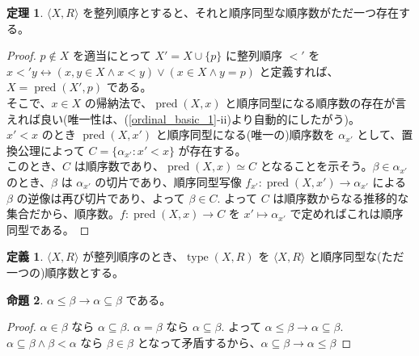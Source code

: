 \documentclass{jsarticle}
\theoremstyle{definition}
\newtheorem*{definition*}{定義}
\newtheorem{theorem}{定理}[section]
\newtheorem{proposition}[theorem]{命題}
\begin{document}
    \begin{theorem}
        $\langle X, R \rangle$ を整列順序とすると、それと順序同型な順序数がただ一つ存在する。
    \end{theorem}
    \begin{proof}
        $p \not\in X$ を適当にとって $X' = X \cup \{p\}$ に整列順序 $<'$ を\\
        $x <' y \leftrightarrow (x, y \in X \land x < y) \lor (x \in X \land y = p)$ と定義すれば、$X = \operatorname{pred}(X', p)$ である。\\
        そこで、$x \in X$ の帰納法で、$\operatorname{pred}(X, x)$ と順序同型になる順序数の存在が言えれば良い(唯一性は、(\ref{ordinal_basic_1}-ii)より自動的にしたがう)。\\
        $x' < x$ のとき $\operatorname{pred}(X, x')$ と順序同型になる(唯一の)順序数を $\alpha_{x'}$ として、置換公理によって $C = \{\alpha_{x'} : x' < x\}$ が存在する。\\
        このとき、$C$ は順序数であり、$\operatorname{pred}(X, x) \simeq C$ となることを示そう。$\beta \in \alpha_{x'}$ のとき、$\beta$ は $\alpha_{x'}$ の切片であり、順序同型写像 $f_{x'} : \operatorname{pred}(X, x') \rightarrow \alpha_{x'}$ による $\beta$ の逆像は再び切片であり、よって $\beta \in C.$ よって $C$ は順序数からなる推移的な集合だから、順序数。$f : \operatorname{pred}(X, x) \rightarrow C$ を $x' \mapsto \alpha_{x'}$ で定めればこれは順序同型である。
    \end{proof}
    \begin{definition*}
        $\langle X, R \rangle$ が整列順序のとき、$\operatorname{type}(X, R)$ を $\langle X, R \rangle$ と順序同型な(ただ一つの)順序数とする。
    \end{definition*}
    \vspace{1ex}
    
    \begin{proposition} \label{ordinal_basic_3} $\alpha \leq \beta \rightarrow \alpha \subseteq \beta$ である。
    \end{proposition}
    \begin{proof}
        $\alpha \in \beta$ なら $\alpha \subseteq \beta.$ $\alpha = \beta$ なら $\alpha \subseteq \beta.$ よって $\alpha \leq \beta \rightarrow \alpha \subseteq \beta.$ \\
        $\alpha \subseteq \beta \land \beta < \alpha$ なら $\beta \in \beta$ となって矛盾するから、$\alpha \subseteq \beta \rightarrow \alpha \leq \beta$
    \end{proof}
        
\end{document}
